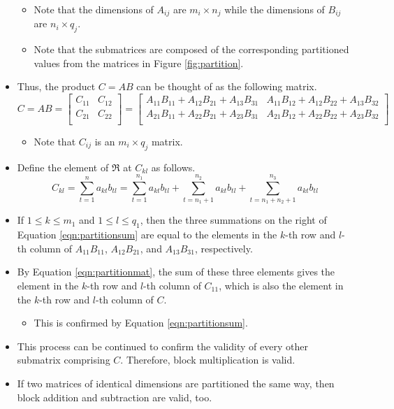 \documentclass[titlepage]{article}
\numberwithin{figure}{section}
\numberwithin{equation}{section}
\begin{document}
\begin{itemize}
    \begin{itemize}
        \item Note that the dimensions of $A_{ij}$ are $m_i\times n_j$ while the dimensions of $B_{ij}$ are $n_i\times q_j$.
        \item Note that the submatrices are composed of the corresponding partitioned values from the matrices in Figure \ref{fig:partition}.
    \end{itemize}
    \item Thus, the product $C=AB$ can be thought of as the following matrix.
    \begin{equation}\label{eqn:partitionmat}
        C = AB =
        \begin{bmatrix}
            C_{11} & C_{12}\\
            C_{21} & C_{22}\\
        \end{bmatrix}
        =
        \begin{bmatrix}
            A_{11}B_{11}+A_{12}B_{21}+A_{13}B_{31} & A_{11}B_{12}+A_{12}B_{22}+A_{13}B_{32}\\
            A_{21}B_{11}+A_{22}B_{21}+A_{23}B_{31} & A_{21}B_{12}+A_{22}B_{22}+A_{23}B_{32}\\
        \end{bmatrix}
    \end{equation}
    \begin{itemize}
        \item Note that $C_{ij}$ is an $m_i\times q_j$ matrix.
    \end{itemize}
    \item Define the element of $\mathfrak{R}$ at $C_{kl}$ as follows.
    \begin{equation}\label{eqn:partitionsum}
        C_{kl} = \sum_{t=1}^n a_{kt}b_{tl}
        = \sum_{t=1}^{n_1} a_{kt}b_{tl} + \sum_{t=n_1+1}^{n_2} a_{kt}b_{tl} + \sum_{t=n_1+n_2+1}^{n_3} a_{kt}b_{tl}
    \end{equation}
    \item If $1\leq k\leq m_1$ and $1\leq l\leq q_1$, then the three summations on the right of Equation \ref{eqn:partitionsum} are equal to the elements in the $k$-th row and $l$-th column of $A_{11}B_{11}$, $A_{12}B_{21}$, and $A_{13}B_{31}$, respectively.
    \item By Equation \ref{eqn:partitionmat}, the sum of these three elements gives the element in the $k$-th row and $l$-th column of $C_{11}$, which is also the element in the $k$-th row and $l$-th column of $C$.
    \begin{itemize}
        \item This is confirmed by Equation \ref{eqn:partitionsum}.
    \end{itemize}
    \item This process can be continued to confirm the validity of every other submatrix comprising $C$. Therefore, block multiplication is valid.
    \item If two matrices of identical dimensions are partitioned the same way, then block addition and subtraction are valid, too.
\end{itemize}
\newpage





\end{document}

